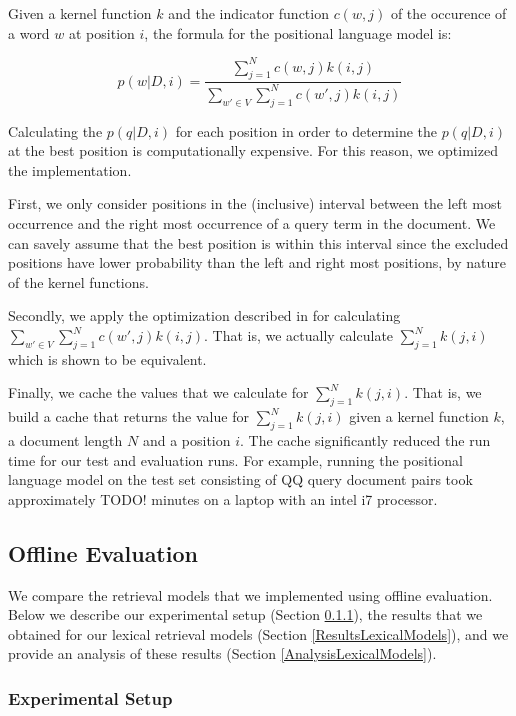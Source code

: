 Given a kernel function $k$ and the indicator function 
$c(w,j)$ of the occurence of a word $w$ at position $i$,
the formula for the positional language model is:

\begin{equation*}
p(w|D,i) = \frac{\sum_{j=1}^N c(w,j)k(i,j)}
{\sum_{w' \in V} \sum_{j=1}^N c(w',j)k(i,j)} 
\end{equation*}

Calculating the $p(q|D,i)$ for each position
in order to determine the $p(q|D,i)$ at the 
best position is computationally expensive.
For this reason, we optimized the implementation.

First, we only consider positions in the (inclusive) interval
between the left most occurrence and the right most
occurrence of a query term in the document.
We can savely assume that the best position is within this interval
since the excluded positions have lower probability
than the left and right most positions,
by nature of the kernel functions.

Secondly, we apply the optimization 
described in \cite{PLM} for calculating
$\sum_{w' \in V} \sum_{j=1}^N c(w',j)k(i,j)$.
That is, we actually calculate 
$\sum_{j=1}^N k(j,i)$ which is shown to be equivalent.

Finally, we cache the values that we calculate for 
$\sum_{j=1}^N k(j,i)$. That is,
we build a cache that returns the
value for $\sum_{j=1}^N k(j,i)$ given
a kernel function $k$, a document length $N$
and a position $i$. The cache
significantly reduced the run time
for our test and evaluation runs.
For example, running the positional
language model on the test set 
consisting of QQ query document pairs
took approximately TODO! minutes
on a laptop with an intel i7 processor.


\subsection{Offline Evaluation}
\label{LexicalModels:Evaluation}

We compare the retrieval models that we implemented
using offline evaluation. Below we describe
our experimental setup (Section \ref{ExperimentalSetup}), 
the results that we obtained for our lexical retrieval models 
(Section \ref{ResultsLexicalModels}), 
and we provide an analysis of these results 
(Section \ref{AnalysisLexicalModels}).

\subsubsection{Experimental Setup}
\label{ExperimentalSetup}

